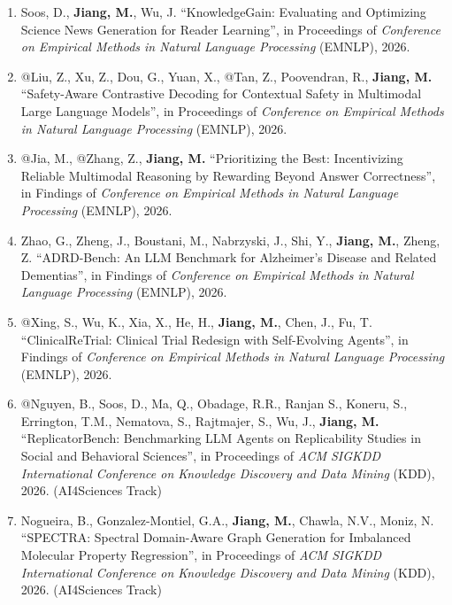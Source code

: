 \documentclass[10pt]{article}
\newenvironment{myindentpar}[1]%
{\begin{list}{}%
         {\setlength{\leftmargin}{#1}}%
         \item[]%
}
{\end{list}}
\newcounter{list}
\begin{document}
\begin{myindentpar}{0.00cm}
\begin{enumerate}[leftmargin=.5cm]
\item[C147] Soos, D., \textbf{Jiang, M.}, Wu, J. ``KnowledgeGain: Evaluating and Optimizing Science News Generation for Reader Learning'', in Proceedings of \textit{Conference on Empirical Methods in Natural Language Processing} (EMNLP), 2026.

\item[C146] @Liu, Z., Xu, Z., Dou, G., Yuan, X., @Tan, Z., Poovendran, R., \textbf{Jiang, M.} ``Safety-Aware Contrastive Decoding for Contextual Safety in Multimodal Large Language Models'', in Proceedings of \textit{Conference on Empirical Methods in Natural Language Processing} (EMNLP), 2026.

\item[C145] @Jia, M., @Zhang, Z., \textbf{Jiang, M.} ``Prioritizing the Best: Incentivizing Reliable Multimodal Reasoning by Rewarding Beyond Answer Correctness'', in Findings of \textit{Conference on Empirical Methods in Natural Language Processing} (EMNLP), 2026.

\item[C144] Zhao, G., Zheng, J., Boustani, M., Nabrzyski, J., Shi, Y., \textbf{Jiang, M.}, Zheng, Z. ``ADRD-Bench: An LLM Benchmark for Alzheimer’s Disease and Related Dementias'', in Findings of \textit{Conference on Empirical Methods in Natural Language Processing} (EMNLP), 2026.

\item[C143] @Xing, S., Wu, K., Xia, X., He, H., \textbf{Jiang, M.}, Chen, J., Fu, T. ``ClinicalReTrial: Clinical Trial Redesign with Self-Evolving Agents'', in Findings of \textit{Conference on Empirical Methods in Natural Language Processing} (EMNLP), 2026.
		
\item[C142] @Nguyen, B., Soos, D., Ma, Q., Obadage, R.R., Ranjan S., Koneru, S., Errington, T.M., Nematova, S., Rajtmajer, S., Wu, J., \textbf{Jiang, M.} ``ReplicatorBench: Benchmarking LLM Agents on Replicability Studies in Social and Behavioral Sciences'', in Proceedings of \textit{ACM SIGKDD International Conference on Knowledge Discovery and Data Mining} (KDD), 2026. (AI4Sciences Track)

\item[C141] Nogueira, B., Gonzalez-Montiel, G.A., \textbf{Jiang, M.}, Chawla, N.V., Moniz, N. ``SPECTRA: Spectral Domain-Aware Graph Generation for Imbalanced Molecular Property Regression'', in Proceedings of \textit{ACM SIGKDD International Conference on Knowledge Discovery and Data Mining} (KDD), 2026. (AI4Sciences Track)


\end{enumerate}
\end{myindentpar}
\end{document}
